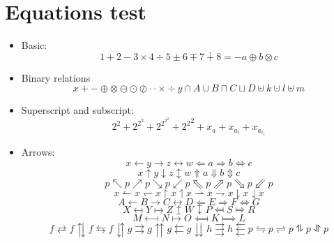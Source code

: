 \documentclass{article}
\begin{document}
\section{Equations test}

\begin{itemize}
  \item Basic:
        \[ 1 + 2 - 3 \times 4 \div 5 \pm 6 \mp 7 \dotplus 8 = -a \oplus b \otimes c \]

  \item Binary relations
        \[
          x + - \oplus \otimes \ominus \odot \oslash \cdot \cdotp \times \div
          y \cap A \cup B \sqcap C \sqcup D \cupleftarrow k \cupdot l \uplus m
        \]

  \item Superscript and subscript:
        \[ 2^2 + 2^{2^2} + 2^{2^{2^2}} + {2^2}^2 + x_a + x_{a_i} + x_{a_{i_1}} \]

  \item Arrows:
        \[
          x \leftarrow y \rightarrow z \leftrightarrow w
            \Leftarrow a \Rightarrow b \Leftrightarrow c
        \]
        \[
          x \uparrow   y \downarrow  z \updownarrow    w
            \Uparrow   a \Downarrow  b \Updownarrow    c
        \]
        \[
          p \nwarrow p \nearrow p \searrow p \swarrow p
            \Nwarrow p \Nearrow p \Searrow p \Swarrow p
        \]
        \[
          x \leftharpoonup    x \leftharpoondown  x
            \upharpoonright   x \upharpoonleft    x
            \rightharpoonup   x \rightharpoondown x
            \downharpoonright x \downharpoonleft  x
        \]
        \[
          A \longleftarrow B \longrightarrow C \longleftrightarrow D
            \Longleftarrow E \Longrightarrow F \Longleftrightarrow G
        \]
        \[
          X \mapsfrom Y \mapsto Z \mapsup W \mapsdown P \Mapsfrom S \Mapsto R
        \]
        \[
          M \longmapsfrom N \longmapsto O \Longmapsfrom K \Longmapsto L
        \]
        \[
          f \rightleftarrows  f \updownarrows f \leftrightarrows f \downuparrows
          g \rightrightarrows g \upuparrows   g \leftleftarrows  g \downdownarrows
          h \rightthreearrows h \leftthreearrows
          p \leftrightharpoons       p \rightleftharpoons
          p \updownharpoonsleftright p \downupharpoonsleftright p
        \]


\end{itemize}
\end{document}
